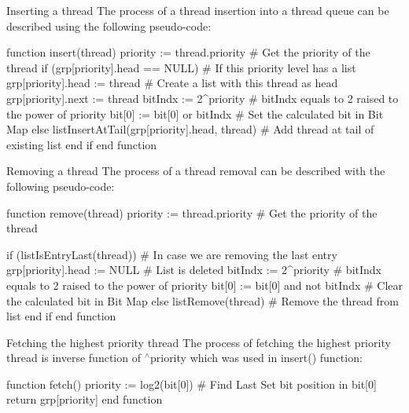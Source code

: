 \begin{DoxyParagraph}{Inserting a thread}
The process of a thread insertion into a thread queue can be described using the following pseudo-\/code\-: 
\begin{DoxyCode}
\textcolor{keyword}{function} insert(thread)
    priority := thread.priority                             \textcolor{preprocessor}{# Get the priority of the thread}
\textcolor{preprocessor}{}
    \textcolor{keywordflow}{if} (grp[priority].head == NULL)                         # If \textcolor{keyword}{this} priority level has a list
        grp[priority].head := thread                        # Create a list with \textcolor{keyword}{this} thread as head
        grp[priority].next := thread
        bitIndx := 2^priority                               # bitIndx equals to 2 raised to the power of 
      priority
        bit[0]  := bit[0] or bitIndx                        # Set the calculated bit in Bit Map
    \textcolor{keywordflow}{else}
        listInsertAtTail(grp[priority].head, thread)        \textcolor{preprocessor}{# Add thread at tail of existing list}
\textcolor{preprocessor}{}    end \textcolor{keywordflow}{if}
end \textcolor{keyword}{function}
\end{DoxyCode}

\end{DoxyParagraph}
\begin{DoxyParagraph}{Removing a thread}
The process of a thread removal can be described with the following pseudo-\/code\-: 
\begin{DoxyCode}
\textcolor{keyword}{function} \textcolor{keyword}{remove}(thread)
    priority := thread.priority                             # Get the priority of the thread

    if (listIsEntryLast(thread))                            # In \textcolor{keywordflow}{case} we are removing the last entry
        grp[priority].head := NULL                          # List is deleted
        bitIndx := 2^priority                               # bitIndx equals to 2 raised to the power of 
      priority
        bit[0]  := bit[0] and not bitIndx                   # Clear the calculated bit in Bit Map
    \textcolor{keywordflow}{else}
        listRemove(thread)                                  # Remove the thread from list
    end \textcolor{keywordflow}{if}
end \textcolor{keyword}{function}
\end{DoxyCode}

\end{DoxyParagraph}
\begin{DoxyParagraph}{Fetching the highest priority thread}
The process of fetching the highest priority thread is inverse function of {$^\wedge$priority} which was used in {\ttfamily insert()} function\-: 
\begin{DoxyCode}
\textcolor{keyword}{function} fetch()
    priority := log2(bit[0])                                \textcolor{preprocessor}{# Find Last Set bit position in bit[0]}
\textcolor{preprocessor}{}
    \textcolor{keywordflow}{return} grp[priority]
end \textcolor{keyword}{function}
\end{DoxyCode}

\end{DoxyParagraph}
